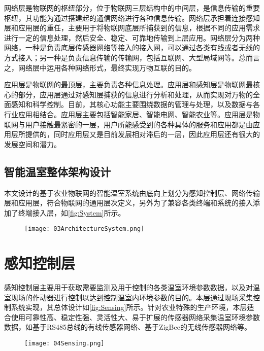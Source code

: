 网络层是物联网的枢纽部分，位于物联网三层结构中的中间层，是信息传输的重要枢纽，其功能为通过搭建起的通信网络进行各种信息传输。网络层承担着连接感知层和应用层的重任，主要用于将物联网底层所捕获到的信息，根据不同的应用需求进行一定的信息处理，然后安全、稳定、可靠地传输到上层应用。网络层分为两种网络，一种是负责底层传感器网络等接入的接入网，可以通过各类有线或者无线的方式接入；另一种是负责信息传输的传输网，包括互联网、大型局域网等。总而言之，网络层中运用各种网络形式，最终实现万物互联的目的。

应用层是物联网的最顶层，主要负责各种信息处理。应用层和感知层是物联网最核心的部分，应用层通过对感知层捕获的信息进行分析和处理，从而实现对万物的全面感知和科学控制。目前，其核心功能主要围绕数据的管理与处理，以及数据与各行业应用相结合。应用层主要包括智能家居、智能电网、智能农业等。应用层是物联网与用户接触最紧密的一层，用户所能感受到的各种具体的服务和应用都是由应用层所提供的，同时应用层又是目前发展相对滞后的一层，因此应用层还有很大的发展空间和潜力。

	
	\subsection{智能温室整体架构设计}
本文设计的基于农业物联网的智能温室系统由底向上划分为感知控制层、网络传输层和应用层，符合物联网的通用层次定义，另外为了兼容各类终端和系统的接入添加了终端接入层，如\ref{fig:System}所示。	
	\begin{figure}[!htp]
		\centering
		\texttt{[image: 03ArchitectureSystem.png]}
	\end{figure}	
\section{感知控制层}
感知控制层主要用于获取需要监测及用于控制的各类温室环境参数数据，以及对温室现场的作动器进行控制以达到控制温室内环境参数的目的。本层通过现场采集控制系统实现，其总体设计如\ref{fig:Sensing}所示。针对农业特殊的生产环境，本层适合使用可靠性高、稳定性强、灵活性大、易于扩展的传感器网络采集温室环境参数数据，如基于RS485总线的有线传感器网络、基于ZigBee的无线传感器网络等。
	\begin{figure}[!htp]
		\centering
		\texttt{[image: 04Sensing.png]}
	\end{figure}

